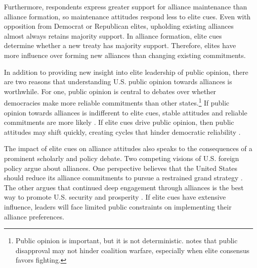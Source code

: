 \documentclass[12pt]{article}
\begin{document}
Furthermore, respondents express greater support for alliance maintenance than alliance formation, so maintenance attitudes respond less to elite cues. 
Even with opposition from Democrat or Republican elites, upholding existing alliances almost always retains majority support. 
In alliance formation, elite cues determine whether a new treaty has majority support. 
Therefore, elites have more influence over forming new alliances than changing existing commitments. 


In addition to providing new insight into elite leadership of public opinion, there are two reasons that understanding U.S. public opinion towards alliances is worthwhile. 
For one, public opinion is central to debates over whether democracies make more reliable commitments than other states.\footnote{Public opinion is important, but it is not deterministic. \citet{Kreps2010} notes that public disapproval may not hinder coalition warfare, especially when elite consensus favors fighting.} 
If public opinion towards alliances is indifferent to elite cues, stable attitudes and reliable commitments are more likely \citep{Gaubatz1996}.
If elite cues drive public opinion, then public attitudes may shift quickly, creating cycles that hinder democratic reliability \citep{GartzkeGleditsch2004}.


The impact of elite cues on alliance attitudes also speaks to the consequences of a prominent scholarly and policy debate. 
Two competing visions of U.S. foreign policy argue about alliances. 
One perspective believes that the United States should reduce its alliance commitments to pursue a restrained grand strategy \citep{Preble2009, Posen2014}.
The other argues that continued deep engagement through alliances is the best way to promote U.S. security and prosperity \citep{Brooksetal2013, BrandsFeaver2017}. 
If elite cues have extensive influence, leaders will face limited public constraints on implementing their alliance preferences. 
\end{document}
